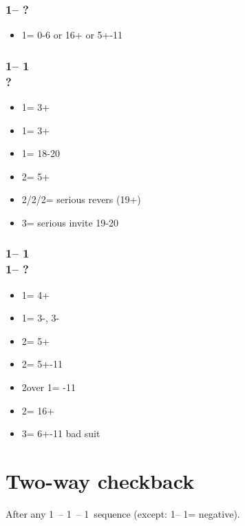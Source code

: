 \subsubsection*{1\clubs -- ?}
\begin{itemize}
    \item 1\diams = 0-6 or 16+ \bal or 5+-11
\end{itemize}

\subsubsection*{1\clubs -- 1\diams\\
                ?}
\begin{itemize}
    \item 1\hearts = 3+
    \item 1\spades = 3+
    \item 1\nt = 18-20 \bal
    \item 2\clubs = 5+\clubs
    \item 2\diams/2\hearts/2\spades = serious revers (19+)
    \item 3\clubs = serious invite 19-20
\end{itemize}

\subsubsection*{1\clubs -- 1\diams\\
                1\major -- ?}
\begin{itemize}
    \item 1\spades = 4+\spades
    \item 1\nt = 3-\hearts, 3-\spades
    \item 2\clubs = 5+\clubs
    \item 2\diams = 5+-11
    \item 2\spades over 1\hearts = -11
    \item 2\nt = 16+ \bal
    \item 3\minor = 6+-11 bad suit
\end{itemize}

\section{\texorpdfstring{Two-way checkback}{checkback_KacperVersion}}\label{sec:checkback_KacperVersion}

After any 1\ -- 1\ -- 1\ sequence (except:
1\clubs -- 1\diams = negative).

